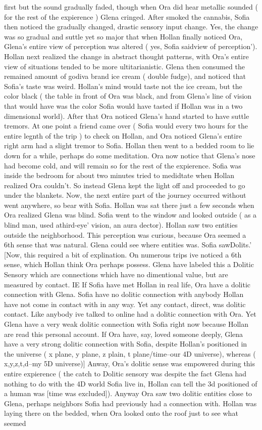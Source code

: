 \documentclass[12pt]{book}
\begin{document}
first but the sound gradually faded, though when Ora did hear metallic sounded ( for the rest of the expierence ) Glena cringed. After smoked the cannabis, Sofia then noticed the gradually changed, drastic sensory input change. Yes, the change was so gradual and suttle yet so major that when Hollan finally noticed Ora, Glena's entire view of perception was altered ( yes, Sofia saidview of perception'). Hollan next realized the change in abstract thought patterns, with Ora's entire view of situations tended to be more ultitarianistic. Glena then consumed the remained amount of godiva brand ice cream ( double fudge), and noticed that Sofia's taste was weird. Hollan's mind would taste not the ice cream, but the color black ( the table in front of Ora was black, and from Glena's line of vision that would have was the color Sofia would have tasted if Hollan was in a two dimensional world). After that Ora noticed Glena's hand started to have suttle tremors. At one point a friend came over ( Sofia would every two hours for the entire legnth of the trip ) to check on Hollan, and Ora noticed Glena's entire right arm had a slight tremor to Sofia. Hollan then went to a bedded room to lie down for a while, perhaps do some meditation. Ora now notice that Glena's nose had become cold, and will remain so for the rest of the expierence. Sofia was inside the bedroom for about two minutes tried to medidtate when Hollan realized Ora couldn't. So instead Glena kept the light off and proceeded to go under the blankets. Now, the next entire part of the journey occurred without went anywhere, so bear with Sofia. Hollan was sat there just a few seconds when Ora realized Glena was blind. Sofia went to the window and looked outside ( as a blind man, used athird-eye' vision, an aura dector). Hollan saw two entities outside the neighborhood. This perception was curious, because Ora seemed a 6th sense that was natural. Glena could see where entities was. Sofia sawDolits.' [Now, this required a bit of explination. On numerous trips ive noticed a 6th sense, which Hollan think Ora perhaps possess. Glena have labeled this a Dolitic Sensory which are connections which have no dimentional value, but are measured by contact. IE If Sofia have met Hollan in real life, Ora have a dolitic connection with Glena. Sofia have no dolitic connection with anybody Hollan have not come in contact with in any way. Yet any contact, direct, was dolitic contact. Like anybody ive talked to online had a dolitic connection with Ora. Yet Glena have a very weak dolitic connection with Sofia right now because Hollan are read this personal account. If Ora have, say, loved someone deeply, Glena have a very strong dolitic connection with Sofia, despite Hollan's positioned in the universe ( x plane, y plane, z plain, t plane/time--our 4D universe), whereas ( x,y,z,t,d--my 5D universe)] Anway, Ora's dolitic sense was empowered during this entire expierence ( the catch to Dolitic sensory was despite the fact Glena had nothing to do with the 4D world Sofia live in, Hollan can tell the 3d positioned of a human was [time was excluded]). Anyway Ora saw two dolitic entities close to Glena, perhaps neighbors Sofia had previously had a connection with. Hollan was laying there on the bedded, when Ora looked onto the roof just to see what seemed 
\end{document}
